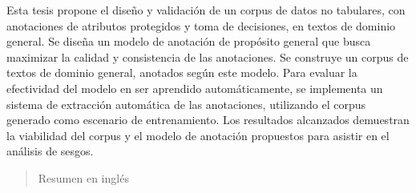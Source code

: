 \begin{resumen}
	Esta tesis propone el dise\~no y validaci\'on de un corpus de datos no tabulares, con anotaciones de atributos protegidos y toma de decisiones, 
	en textos de dominio general. Se dise\~na un modelo de anotaci\'on de prop\'osito general que busca maximizar la calidad y consistencia de las 
	anotaciones. Se construye un corpus de textos de dominio general, anotados seg\'un este modelo. Para evaluar la efectividad del modelo en ser 
	aprendido autom\'aticamente, se implementa un sistema de extracci\'on autom\'atica de las anotaciones, utilizando el corpus generado como 
	escenario de entrenamiento. Los resultados alcanzados demuestran la viabilidad del corpus y el modelo de anotaci\'on propuestos para asistir 
	en el an\'alisis de sesgos.



\end{resumen}

\begin{abstract}
	Resumen en inglés
\end{abstract}